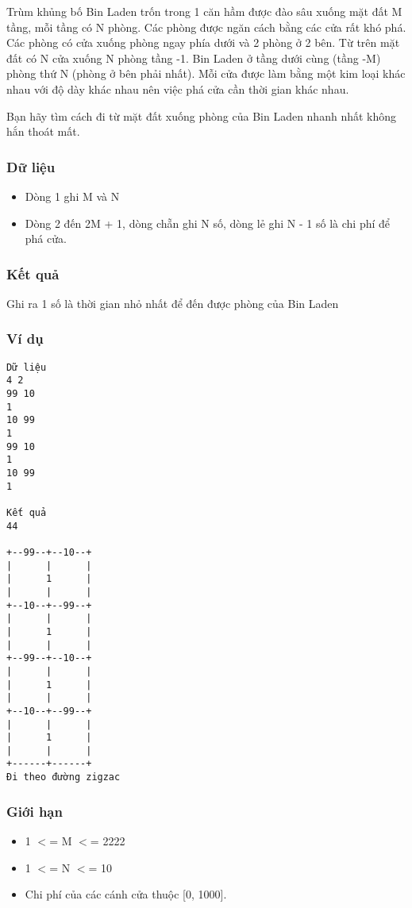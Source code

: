 

Trùm khủng bố Bin Laden trốn trong 1 căn hầm được đào sâu xuống mặt đất M tầng, mỗi tầng có N phòng. Các phòng được ngăn cách bằng các cửa rất khó phá. Các phòng có cửa xuống phòng ngay phía dưới và 2 phòng ở 2 bên. Từ trên mặt đất có N cửa xuống N phòng tầng -1. Bin Laden ở tầng dưới cùng (tầng -M) phòng thứ N (phòng ở bên phải nhất). Mỗi cửa được làm bằng một kim loại khác nhau với độ dày khác nhau nên việc phá cửa cần thời gian khác nhau.

Bạn hãy tìm cách đi từ mặt đất xuống phòng của Bin Laden nhanh nhất không hắn thoát mất.

\subsubsection{Dữ liệu}
\begin{itemize}
	\item Dòng 1 ghi M và N
	\item Dòng 2 đến 2M + 1, dòng chẵn ghi N số, dòng lẻ ghi N - 1 số là chi phí để phá cửa.
\end{itemize}

\subsubsection{Kết quả}

Ghi ra 1 số là thời gian nhỏ nhất để đến được phòng của Bin Laden

\subsubsection{Ví dụ}
\begin{verbatim}
Dữ liệu
4 2
99 10
1
10 99
1
99 10
1
10 99
1

Kết quả
44

+--99--+--10--+
|      |      |
|      1      |
|      |      |
+--10--+--99--+
|      |      |
|      1      |
|      |      |
+--99--+--10--+
|      |      |
|      1      |
|      |      |
+--10--+--99--+
|      |      |
|      1      |
|      |      |
+------+------+
Đi theo đường zigzac
\end{verbatim}

\subsubsection{Giới hạn}
\begin{itemize}
	\item 1 $<$= M $<$= 2222
	\item 1 $<$= N $<$= 10
	\item Chi phí của các cánh cửa thuộc [0, 1000].
\end{itemize}